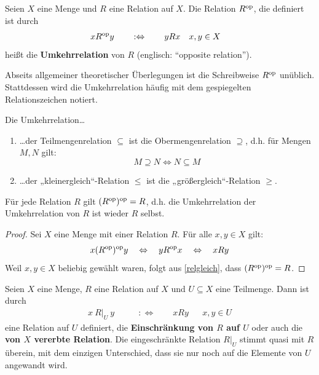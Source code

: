\begin{defin}[Umkehrrelation] \label{def:umkehrrel} 
    Seien $X$ eine Menge und $R$ eine Relation auf $X$. Die Relation $R^{\mathrm{op}}$, die definiert ist durch
    \begin{align*}
        xR^{\mathrm{op}} y \qquad &:\Leftrightarrow\qquad yRx && x,y\in X
    \end{align*}
    heißt die \textbf{Umkehrrelation} von $R$ (englisch: ``opposite relation''). 
\end{defin}


\begin{nota} \label{spiegelrel}
    Abseits allgemeiner theoretischer Überlegungen ist die Schreibweise $R^{\mathrm{op}}$ unüblich. Stattdessen wird die Umkehrrelation häufig mit dem gespiegelten Relationszeichen notiert.
\end{nota}


\begin{bsp}
    Die Umkehrrelation\dots
    \begin{enumerate}
        \item \dots der Teilmengenrelation $\subseteq$ ist die Obermengenrelation $\supseteq$, d.h. für Mengen $M,N$ gilt:
            \[M\supseteq N \iff N\subseteq M \]
        \item \dots der „kleinergleich“-Relation $\le$ ist die „größergleich“-Relation $\ge$.
    \end{enumerate}
\end{bsp}


\begin{bem}[*]
    Für jede Relation $R$ gilt $(R^{\mathrm{op}})^{\mathrm{op}}=R$, d.h. die Umkehrrelation der Umkehrrelation von $R$ ist wieder $R$ selbst.
\end{bem}
\begin{proof}
    Sei $X$ eine Menge mit einer Relation $R$. Für alle $x,y\in X$ gilt:
        \[ x(R^{\mathrm{op}})^{\mathrm{op}} y \quad\Leftrightarrow\quad yR^{\mathrm{op}} x \quad\Leftrightarrow\quad xRy  \]
    Weil $x,y\in X$ beliebig gewählt waren, folgt aus \cref{relgleich}, dass $(R^{\mathrm{op}})^{\mathrm{op}} = R$.
\end{proof}


\begin{defin} \label{def:einschraenkungrelation} 
    Seien $X$ eine Menge, $R$ eine Relation auf $X$ und $U\subseteq X$ eine Teilmenge. Dann ist durch
    \begin{align*}
        x\ R\vert_U\ y \qquad& :\Leftrightarrow\qquad xRy &&x,y\in U
    \end{align*}
    eine Relation auf $U$ definiert, die \textbf{Einschränkung von $R$ auf $U$} oder auch die \textbf{von $X$ vererbte Relation}. Die eingeschränkte Relation $R\vert_U$ stimmt quasi mit $R$ überein, mit dem einzigen Unterschied, dass sie nur noch auf die Elemente von $U$ angewandt wird.
\end{defin}


